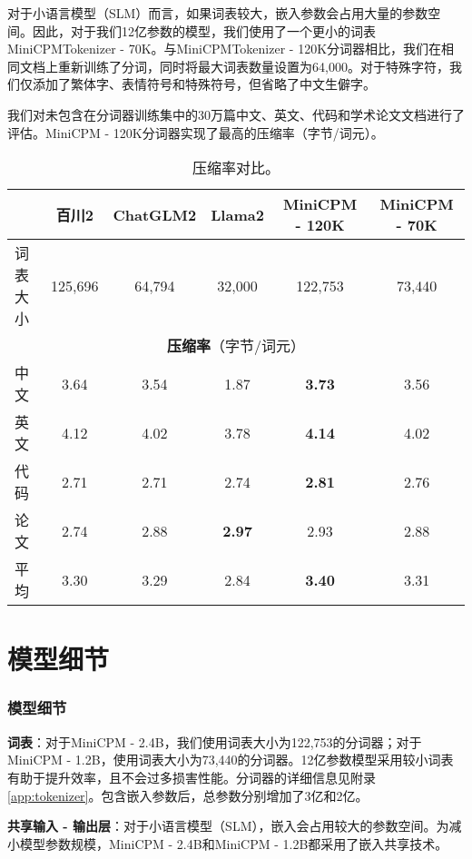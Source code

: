 对于小语言模型（SLM）而言，如果词表较大，嵌入参数会占用大量的参数空间。因此，对于我们12亿参数的模型，我们使用了一个更小的词表MiniCPMTokenizer - 70K。与MiniCPMTokenizer - 120K分词器相比，我们在相同文档上重新训练了分词，同时将最大词表数量设置为64,000。对于特殊字符，我们仅添加了繁体字、表情符号和特殊符号，但省略了中文生僻字。

我们对未包含在分词器训练集中的30万篇中文、英文、代码和学术论文文档进行了评估。MiniCPM - 120K分词器实现了最高的压缩率（字节/词元）。

\begin{table}[htbp]
    \centering
    \begin{tabular}{lccccc}
    \toprule
      & {\textbf{百川2}}  & {\textbf{ChatGLM2}} & {\textbf{Llama2}} & {\textbf{MiniCPM - 120K}}  & {\textbf{MiniCPM - 70K}}\\
    \midrule
    词表大小 & 125,696 & 64,794 & 32,000 & 122,753 & 73,440\\
    \midrule
    \multicolumn{6}{c}{\textbf{压缩率}（字节/词元） }\\
    \midrule
    中文 & 3.64   & 3.54  & 1.87  & \textbf{3.73} &  3.56 \\
    英文 & 4.12   & 4.02  & 3.78  & \textbf{4.14} & 4.02 \\
    代码    & 2.71   & 2.71  & 2.74  & \textbf{2.81} & 2.76 \\
    论文   & 2.74   & 2.88  & \textbf{2.97}  & 2.93 & 2.88\\
    \midrule
    平均 & 3.30   & 3.29  & 2.84  & \textbf{3.40}  & 3.31 \\
    \bottomrule
    \end{tabular}
    \caption{压缩率对比。}
    \label{tab:compression_ratio}
\end{table}
    

\section{模型细节}
\subsubsection{模型细节}
\noindent\textbf{词表}：对于MiniCPM - 2.4B，我们使用词表大小为122,753的分词器；对于MiniCPM - 1.2B，使用词表大小为73,440的分词器。12亿参数模型采用较小词表有助于提升效率，且不会过多损害性能。分词器的详细信息见附录\ref{app:tokenizer}。包含嵌入参数后，总参数分别增加了3亿和2亿。 

\noindent\textbf{共享输入 - 输出层}：对于小语言模型（SLM），嵌入会占用较大的参数空间。为减小模型参数规模，MiniCPM - 2.4B和MiniCPM - 1.2B都采用了嵌入共享技术。 

